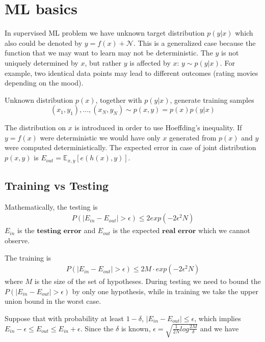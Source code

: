 \documentclass[class=article, crop=false]{standalone}
\numberwithin{equation}{section}
\begin{document}
\section{ML basics}
In supervised ML problem we have unknown target distribution $p(y|x)$ which also could be denoted by $y=f(x) + \mathcal{N}$. This is a generalized case because the function that we may want to learn may not be deterministic. The $y$ is not uniquely determined by $x$, but rather $y$ is affected by $x$: $y\sim p(y|x)$. For example, two identical data points may lead to different outcomes (rating movies depending on the mood).

Unknown distribution $p(x)$, together with $p(y|x)$, generate training samples $$(x_1, y_1), ..., (x_N, y_N) \sim p(x, y)=p(x)p(y|x)$$

The distribution on $x$ is introduced in order to use Hoeffding's inequality. If $y=f(x)$ were deterministic we would have only $x$ generated from $p(x)$ and $y$ were computed deterministically.
The expected error in case of joint distribution $p(x, y)$ is $E_{out}=\mathbb{E}_{x, y}[e(h(x), y)]$.

\subsection{Training vs Testing}
Mathematically, the testing is
\begin{align}
    P(|E_{in} - E_{out}|>\epsilon) \leq 2 exp(-2\epsilon^2N)
\end{align}
$E_{in}$ is the $\textbf{testing error}$ and $E_{out}$ is the expected $\textbf{real error}$ which we cannot observe. 

The training is
\begin{align}
    P(|E_{in} - E_{out}|>\epsilon) \leq 2 M\cdot exp(-2\epsilon^2N)
\end{align}\label{eqn:hoeffding-training}
where $M$ is the size of the set of hypotheses. During testing we need to bound the $P(|E_{in} - E_{out}|>\epsilon)$ by only one hypothesis, while in training we take the upper union bound in the worst case.

Suppose that with probability at least $1-\delta$, $|E_{in}-E_{out}|\leq \epsilon$, which implies $E_{in}-\epsilon \leq E_{out}\leq E_{in}+\epsilon$. Since the $\delta$ is known, $\epsilon=\sqrt{\frac{1}{2N}log\frac{2M}{\delta}}$ and we have 
\end{document}
